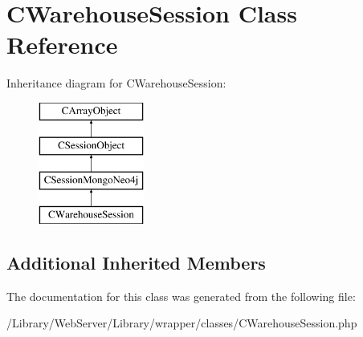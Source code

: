 \hypertarget{class_c_warehouse_session}{\section{C\-Warehouse\-Session Class Reference}
\label{class_c_warehouse_session}
}
Inheritance diagram for C\-Warehouse\-Session\-:\begin{figure}[H]
\begin{center}
\leavevmode
\includegraphics[height=4.000000cm]{class_c_warehouse_session}
\end{center}
\end{figure}
\subsection*{Additional Inherited Members}


The documentation for this class was generated from the following file\-:\begin{DoxyCompactItemize}
\item 
/\-Library/\-Web\-Server/\-Library/wrapper/classes/C\-Warehouse\-Session.\-php\end{DoxyCompactItemize}
